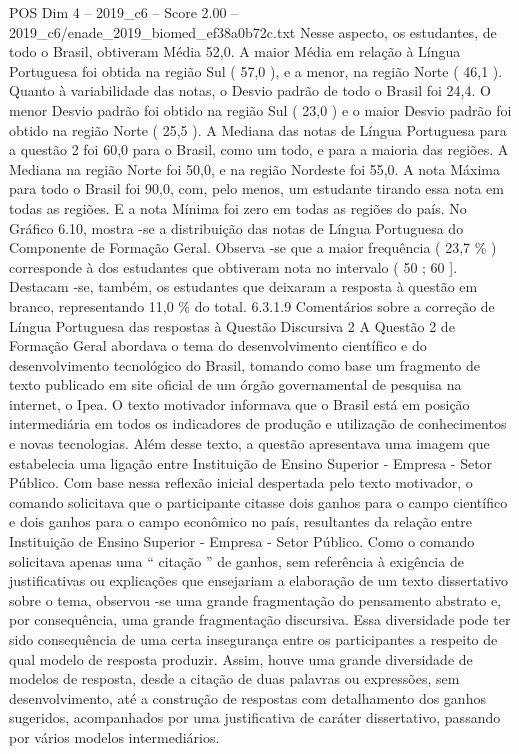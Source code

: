 \begin{textsample}{POS Dim 4 – 2019\_c6 – Score 2.00 – 2019\_c6/enade\_2019\_biomed\_ef38a0b72c.txt}
Nesse aspecto, os estudantes, de todo o Brasil, obtiveram Média 52,0.
A maior Média em relação à Língua Portuguesa foi obtida na região Sul ( 57,0 ), e a menor, na região Norte ( 46,1 ).
Quanto à variabilidade das notas, o Desvio padrão de todo o Brasil foi 24,4.
O menor Desvio padrão foi obtido na região Sul ( 23,0 ) e o maior Desvio padrão foi obtido na região Norte ( 25,5 ).
A Mediana das notas de Língua Portuguesa para a questão 2 foi 60,0 para o Brasil, como um todo, e para a maioria das regiões.
A Mediana na região Norte foi 50,0, e na região Nordeste foi 55,0.
A nota Máxima para todo o Brasil foi 90,0, com, pelo menos, um estudante tirando essa nota em todas as regiões.
E a nota Mínima foi zero em todas as regiões do país.
No Gráfico 6.10, mostra -se a distribuição das notas de Língua Portuguesa do Componente de Formação Geral.
Observa -se que a maior frequência ( 23,7 \% ) corresponde à dos estudantes que obtiveram nota no intervalo ( 50 ; 60 ].
Destacam -se, também, os estudantes que deixaram a resposta à questão em branco, representando 11,0 \% do total. 6.3.1.9 Comentários sobre a correção de Língua Portuguesa das respostas à Questão Discursiva 2 A Questão 2 de Formação Geral abordava o tema do desenvolvimento científico e do desenvolvimento tecnológico do Brasil, tomando como base um fragmento de texto publicado em site oficial de um órgão governamental de pesquisa na internet, o Ipea.
O texto motivador informava que o Brasil está em posição intermediária em todos os indicadores de produção e utilização de conhecimentos e novas tecnologias.
Além desse texto, a questão apresentava uma imagem que estabelecia uma ligação entre Instituição de Ensino Superior - Empresa - Setor Público.
Com base nessa reflexão inicial despertada pelo texto motivador, o comando solicitava que o participante citasse dois ganhos para o campo científico e dois ganhos para o campo econômico no país, resultantes da relação entre Instituição de Ensino Superior - Empresa - Setor Público.
Como o comando solicitava apenas uma “ citação ” de ganhos, sem referência à exigência de justificativas ou explicações que ensejariam a elaboração de um texto dissertativo sobre o tema, observou -se uma grande fragmentação do pensamento abstrato e, por consequência, uma grande fragmentação discursiva.
Essa diversidade pode ter sido consequência de uma certa insegurança entre os participantes a respeito de qual modelo de resposta produzir.
Assim, houve uma grande diversidade de modelos de resposta, desde a citação de duas palavras ou expressões, sem desenvolvimento, até a construção de respostas com detalhamento dos ganhos sugeridos, acompanhados por uma justificativa de caráter dissertativo, passando por vários modelos intermediários.

\end{textsample}

